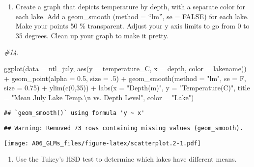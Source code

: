 \documentclass[
]{article}
\newenvironment{Shaded}{\begin{snugshade}}{\end{snugshade}}
\newcommand{\AttributeTok}[1]{\textcolor[rgb]{0.77,0.63,0.00}{#1}}
\newcommand{\CommentTok}[1]{\textcolor[rgb]{0.56,0.35,0.01}{\textit{#1}}}
\newcommand{\DecValTok}[1]{\textcolor[rgb]{0.00,0.00,0.81}{#1}}
\newcommand{\FloatTok}[1]{\textcolor[rgb]{0.00,0.00,0.81}{#1}}
\newcommand{\FunctionTok}[1]{\textcolor[rgb]{0.00,0.00,0.00}{#1}}
\newcommand{\NormalTok}[1]{#1}
\newcommand{\SpecialCharTok}[1]{\textcolor[rgb]{0.00,0.00,0.00}{#1}}
\newcommand{\StringTok}[1]{\textcolor[rgb]{0.31,0.60,0.02}{#1}}
\providecommand{\tightlist}{%
  \setlength{\itemsep}{0pt}\setlength{\parskip}{0pt}}
\begin{document}
\begin{enumerate}
\def\labelenumi{\arabic{enumi}.}
\setcounter{enumi}{13}
\tightlist
\item
  Create a graph that depicts temperature by depth, with a separate
  color for each lake. Add a geom\_smooth (method = ``lm'', se = FALSE)
  for each lake. Make your points 50 \% transparent. Adjust your y axis
  limits to go from 0 to 35 degrees. Clean up your graph to make it
  pretty.
\end{enumerate}

\begin{Shaded}
\begin{Highlighting}[]
\CommentTok{\#14.}

\FunctionTok{ggplot}\NormalTok{(}\AttributeTok{data =}\NormalTok{ ntl\_july, }\FunctionTok{aes}\NormalTok{(}\AttributeTok{y =}\NormalTok{ temperature\_C, }\AttributeTok{x =}\NormalTok{ depth,}
                            \AttributeTok{color =}\NormalTok{ lakename)) }\SpecialCharTok{+} 
  \FunctionTok{geom\_point}\NormalTok{(}\AttributeTok{alpha =} \FloatTok{0.5}\NormalTok{, }\AttributeTok{size =}\NormalTok{ .}\DecValTok{5}\NormalTok{) }\SpecialCharTok{+}
  \FunctionTok{geom\_smooth}\NormalTok{(}\AttributeTok{method =} \StringTok{"lm"}\NormalTok{, }\AttributeTok{se =}\NormalTok{ F, }\AttributeTok{size =} \FloatTok{0.75}\NormalTok{) }\SpecialCharTok{+}
  \FunctionTok{ylim}\NormalTok{(}\FunctionTok{c}\NormalTok{(}\DecValTok{0}\NormalTok{,}\DecValTok{35}\NormalTok{)) }\SpecialCharTok{+} 
  \FunctionTok{labs}\NormalTok{(}\AttributeTok{x =} \StringTok{"Depth(m)"}\NormalTok{, }\AttributeTok{y =} \StringTok{"Temperature(C)"}\NormalTok{, }\AttributeTok{title =} \StringTok{"Mean July Lake Temp.}\SpecialCharTok{\textbackslash{}n}\StringTok{ vs.}
\StringTok{       Depth Level"}\NormalTok{, }\AttributeTok{color =} \StringTok{"Lake"}\NormalTok{)}
\end{Highlighting}
\end{Shaded}

\begin{verbatim}
## `geom_smooth()` using formula 'y ~ x'
\end{verbatim}

\begin{verbatim}
## Warning: Removed 73 rows containing missing values (geom_smooth).
\end{verbatim}

\texttt{[image: A06\_GLMs\_files/figure-latex/scatterplot.2-1.pdf]}

\begin{enumerate}
\def\labelenumi{\arabic{enumi}.}
\setcounter{enumi}{14}
\tightlist
\item
  Use the Tukey's HSD test to determine which lakes have different
  means.
\end{enumerate}
\end{document}
